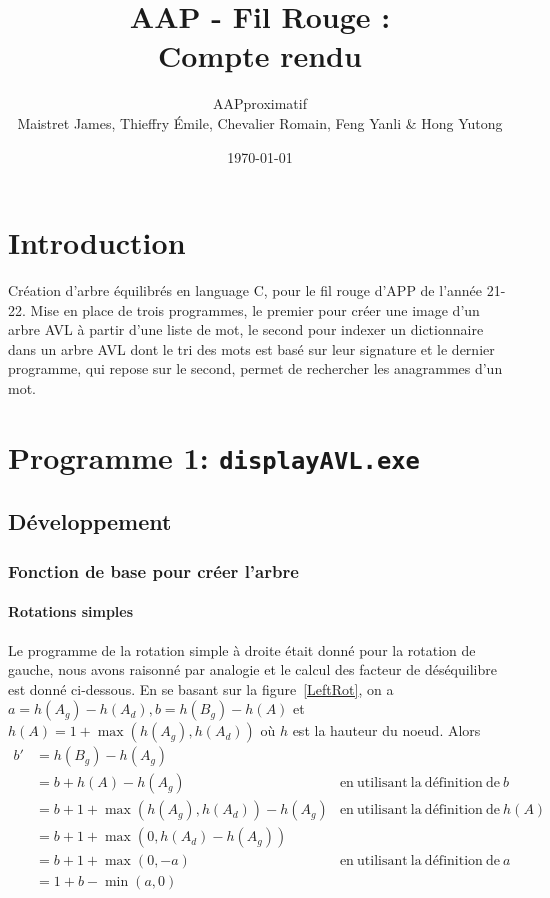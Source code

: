 \documentclass{article} %
\title{AAP - Fil Rouge :\\ Compte rendu}
\author{AAPproximatif \\ Maistret James, Thieffry \'Emile, Chevalier Romain, Feng Yanli \&  Hong Yutong}
\date{\today}
\begin{document}
\maketitle
\setcounter{secnumdepth}{3}
\setcounter{tocdepth}{3}

\tableofcontents
\listoffigures

\newpage

\section{Introduction}

Création d'arbre équilibrés en language C, pour le fil rouge d'APP de l'année 21-22. Mise en place de trois programmes, le premier pour créer une image d'un arbre AVL à partir d'une liste de mot, le second pour indexer un dictionnaire dans un arbre AVL dont le tri des mots est basé sur leur signature et le dernier programme, qui repose sur le second, permet de rechercher les anagrammes d'un mot. 

\section{Programme 1: \texttt{displayAVL.exe}}
\label{sec:prog_1}
\subsection{Développement}
\subsubsection{Fonction de base pour créer l'arbre}
\paragraph{Rotations simples} Le programme de la rotation simple à droite était donné pour la rotation de gauche, nous avons raisonné par analogie et le calcul des facteur de déséquilibre est donné ci-dessous. En se basant sur la figure~\ref{LeftRot}, on a \( a = h(A_g) - h(A_d), b = h(B_g) - h(A)\) et \(h(A) = 1 +\max (h(A_g), h(A_d)) \) où \(h\) est la hauteur du noeud. Alors 
\begin{align*}
b' &= h(B_g)-h(A_g) \\
&= b + h(A) - h(A_g) & \mathrm{en\  utilisant \ la \  définition \  de } \ b  \\
&= b +  1 +\max (h(A_g), h(A_d)) - h(A_g) & \mathrm{en \ utilisant \ la \ définition\ de} \ h(A)  \\
&= b + 1 + \max(0, h(A_d)-h(A_g))\\
&= b + 1 + \max(0, -a) & \mathrm{en\  utilisant \ la \  définition \  de } \ a \\
&= 1+ b -\min(a,0)
\end{align*} %
\end{document}
